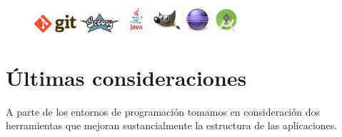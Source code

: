 	\begin{figure}	
		\centering
		\includegraphics[width=0.14\textwidth]{figuras/git}
		\includegraphics[width=0.13\textwidth]{figuras/groovy}
		\includegraphics[width=0.09\textwidth]{figuras/java}
		\includegraphics[width=0.09\textwidth]{figuras/gimp}
		\includegraphics[width=0.09\textwidth]{figuras/eclipse}
		\includegraphics[width=0.08\textwidth]{figuras/astudio}	
	\end{figure}

\clearpage


\section{Últimas consideraciones}
	
A parte de los entornos de programación tomamos en consideración dos herramientas que mejoran sustancialmente la estructura de las aplicaciones.

